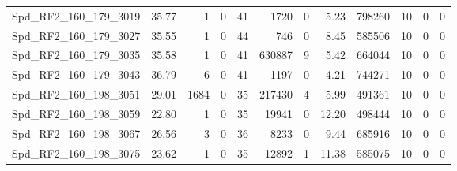 \begin{longtable}[c]{@{}lrrrrrrrrrrr@{}}
Spd\_RF2\_160\_179\_3019      & 35.77                  & 1                       & 0                       & 41                     & 1720                    & 0                       & 5.23                    & 798260                   & 10                       & 0                        & 0                        \\
Spd\_RF2\_160\_179\_3027      & 35.55                  & 1                       & 0                       & 44                     & 746                     & 0                       & 8.45                    & 585506                   & 10                       & 0                        & 0                        \\
Spd\_RF2\_160\_179\_3035      & 35.58                  & 1                       & 0                       & 41                     & 630887                  & 9                       & 5.42                    & 664044                   & 10                       & 0                        & 0                        \\
Spd\_RF2\_160\_179\_3043      & 36.79                  & 6                       & 0                       & 41                     & 1197                    & 0                       & 4.21                    & 744271                   & 10                       & 0                        & 0                        \\
Spd\_RF2\_160\_198\_3051      & 29.01                  & 1684                    & 0                       & 35                     & 217430                  & 4                       & 5.99                    & 491361                   & 10                       & 0                        & 0                        \\
Spd\_RF2\_160\_198\_3059      & 22.80                  & 1                       & 0                       & 35                     & 19941                   & 0                       & 12.20                   & 498444                   & 10                       & 0                        & 0                        \\
Spd\_RF2\_160\_198\_3067      & 26.56                  & 3                       & 0                       & 36                     & 8233                    & 0                       & 9.44                    & 685916                   & 10                       & 0                        & 0                        \\
Spd\_RF2\_160\_198\_3075      & 23.62                  & 1                       & 0                       & 35                     & 12892                   & 1                       & 11.38                   & 585075                   & 10                       & 0                        & 0                        \\

\end{longtable}

